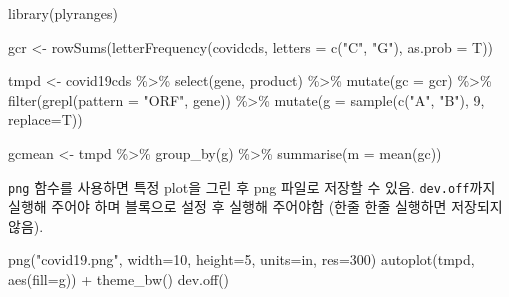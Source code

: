\documentclass[
]{book}
\newenvironment{Shaded}{\begin{snugshade}}{\end{snugshade}}
\newcommand{\AttributeTok}[1]{\textcolor[rgb]{0.77,0.63,0.00}{#1}}
\newcommand{\DecValTok}[1]{\textcolor[rgb]{0.00,0.00,0.81}{#1}}
\newcommand{\FunctionTok}[1]{\textcolor[rgb]{0.00,0.00,0.00}{#1}}
\newcommand{\NormalTok}[1]{#1}
\newcommand{\OtherTok}[1]{\textcolor[rgb]{0.56,0.35,0.01}{#1}}
\newcommand{\SpecialCharTok}[1]{\textcolor[rgb]{0.00,0.00,0.00}{#1}}
\newcommand{\StringTok}[1]{\textcolor[rgb]{0.31,0.60,0.02}{#1}}
\begin{document}
\begin{Shaded}
\begin{Highlighting}[]
\FunctionTok{library}\NormalTok{(plyranges)}

\NormalTok{gcr }\OtherTok{\textless{}{-}} \FunctionTok{rowSums}\NormalTok{(}\FunctionTok{letterFrequency}\NormalTok{(covidcds, }\AttributeTok{letters =} \FunctionTok{c}\NormalTok{(}\StringTok{"C"}\NormalTok{, }\StringTok{"G"}\NormalTok{), }\AttributeTok{as.prob =}\NormalTok{ T))}

\NormalTok{tmpd }\OtherTok{\textless{}{-}}\NormalTok{ covid19cds }\SpecialCharTok{\%\textgreater{}\%} 
    \FunctionTok{select}\NormalTok{(gene, product) }\SpecialCharTok{\%\textgreater{}\%} 
    \FunctionTok{mutate}\NormalTok{(}\AttributeTok{gc =}\NormalTok{ gcr) }\SpecialCharTok{\%\textgreater{}\%} 
    \FunctionTok{filter}\NormalTok{(}\FunctionTok{grepl}\NormalTok{(}\AttributeTok{pattern =} \StringTok{"ORF"}\NormalTok{, gene)) }\SpecialCharTok{\%\textgreater{}\%} 
    \FunctionTok{mutate}\NormalTok{(}\AttributeTok{g =} \FunctionTok{sample}\NormalTok{(}\FunctionTok{c}\NormalTok{(}\StringTok{"A"}\NormalTok{, }\StringTok{"B"}\NormalTok{), }\DecValTok{9}\NormalTok{, }\AttributeTok{replace=}\NormalTok{T)) }



\NormalTok{gcmean }\OtherTok{\textless{}{-}}\NormalTok{ tmpd }\SpecialCharTok{\%\textgreater{}\%} 
  \FunctionTok{group\_by}\NormalTok{(g) }\SpecialCharTok{\%\textgreater{}\%} 
  \FunctionTok{summarise}\NormalTok{(}\AttributeTok{m =} \FunctionTok{mean}\NormalTok{(gc))}
\end{Highlighting}
\end{Shaded}

\texttt{png} 함수를 사용하면 특정 plot을 그린 후 png 파일로 저장할 수 있음. \texttt{dev.off}까지 실행해 주어야 하며 블록으로 설정 후 실행해 주어야함 (한줄 한줄 실행하면 저장되지 않음).

\begin{Shaded}
\begin{Highlighting}[]
\FunctionTok{png}\NormalTok{(}\StringTok{"covid19.png"}\NormalTok{, }\AttributeTok{width=}\DecValTok{10}\NormalTok{, }\AttributeTok{height=}\DecValTok{5}\NormalTok{, }\AttributeTok{units=}\StringTok{\textquotesingle{}in\textquotesingle{}}\NormalTok{, }\AttributeTok{res=}\DecValTok{300}\NormalTok{)}
\FunctionTok{autoplot}\NormalTok{(tmpd, }\FunctionTok{aes}\NormalTok{(}\AttributeTok{fill=}\NormalTok{g)) }\SpecialCharTok{+}
  \FunctionTok{theme\_bw}\NormalTok{()}
\FunctionTok{dev.off}\NormalTok{()}
\end{Highlighting}
\end{Shaded}
\end{document}
